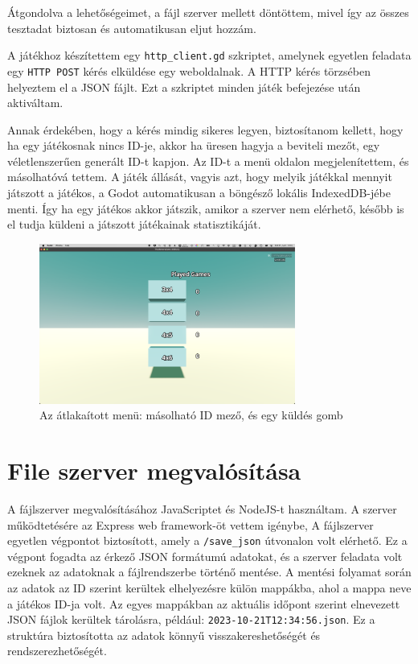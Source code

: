 Átgondolva a lehetőségeimet, a fájl szerver mellett döntöttem, mivel így az összes tesztadat biztosan és automatikusan eljut hozzám.

A játékhoz készítettem egy \lstinline{http_client.gd} szkriptet, amelynek egyetlen feladata egy \lstinline{HTTP POST} kérés elküldése egy weboldalnak. A HTTP kérés törzsében helyeztem el a JSON fájlt. Ezt a szkriptet minden játék befejezése után aktiváltam.

Annak érdekében, hogy a kérés mindig sikeres legyen, biztosítanom kellett, hogy ha egy játékosnak nincs ID-je, akkor ha üresen hagyja a beviteli mezőt, egy véletlenszerűen generált ID-t kapjon. Az ID-t a menü oldalon megjelenítettem, és másolhatóvá tettem. A játék állását, vagyis azt, hogy melyik játékkal mennyit játszott a játékos, a Godot automatikusan a böngésző lokális IndexedDB-jébe menti. Így ha egy játékos akkor játszik, amikor a szerver nem elérhető, később is el tudja küldeni a játszott játékainak statisztikáját.\begin{figure}[h]
    \centering
    \includegraphics[width=0.75\textwidth]{img/menu_remake.png}
    \caption{Az átlakaított menü: másolható ID mező, és egy küldés gomb}
    \label{img:menu_remake}  
\end{figure}

\section{File szerver megvalósítása}
A fájlszerver megvalósításához JavaScriptet és NodeJS-t használtam.
A szerver működtetésére az Express web framework-öt vettem igénybe, 
A fájlszerver egyetlen végpontot biztosított, amely a \lstinline{/save_json} útvonalon volt elérhető. 
Ez a végpont fogadta az érkező JSON formátumú adatokat, és a szerver feladata volt ezeknek az adatoknak a fájlrendszerbe történő mentése. 
A mentési folyamat során az adatok az ID szerint kerültek elhelyezésre külön mappákba, ahol a mappa neve a játékos ID-ja volt. 
Az egyes mappákban az aktuális időpont szerint elnevezett JSON fájlok kerültek tárolásra, például: \texttt{2023-10-21T12:34:56.json}. 
Ez a struktúra biztosította az adatok könnyű visszakereshetőségét és rendszerezhetőségét.

